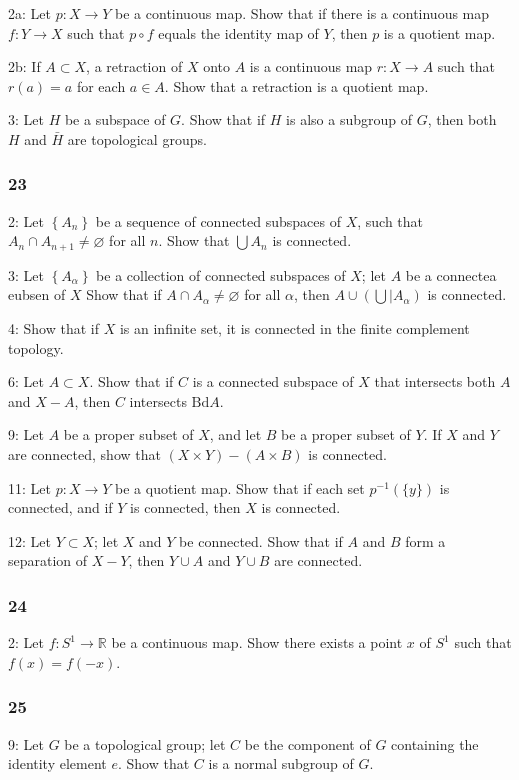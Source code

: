 \documentclass{article}
\begin{document}
2a: Let $p: X \rightarrow Y$ be a continuous map. Show that if there is a continuous map $f: Y \rightarrow X$ such that $p \circ f$ equals the identity map of $Y$, then $p$ is a quotient map.

2b: If $A \subset X$, a retraction of $X$ onto $A$ is a continuous map $r: X \rightarrow A$ such that $r(a)=a$ for each $a \in A$. Show that a retraction is a quotient map.

3: Let $H$ be a subspace of $G$. Show that if $H$ is also a subgroup of $G$, then both $H$ and $\bar{H}$ are topological groups.

\subsubsection*{23}
2: Let $\left\{A_{n}\right\}$ be a sequence of connected subspaces of $X$, such that $A_{n} \cap A_{n+1} \neq \varnothing$ for all $n$. Show that $\bigcup A_{n}$ is connected.

3: Let $\left\{A_{\alpha}\right\}$ be a collection of connected subspaces of $X$; let $A$ be a connectea eubsen of $X$ Show that if $A \cap A_{\alpha} \neq \varnothing$ for all $\alpha$, then $A \cup\left(\bigcup \mid A_{\alpha}\right)$ is connected.

4: Show that if $X$ is an infinite set, it is connected in the finite complement topology.

6: Let $A \subset X$. Show that if $C$ is a connected subspace of $X$ that intersects both $A$ and $X-A$, then $C$ intersects $\mathrm{Bd} A$.

9: Let $A$ be a proper subset of $X$, and let $B$ be a proper subset of $Y$. If $X$ and $Y$ are connected, show that $(X \times Y)-(A \times B)$ is connected.

11: Let $p: X \rightarrow Y$ be a quotient map. Show that if each set $p^{-1}(\{y\})$ is connected, and if $Y$ is connected, then $X$ is connected.

12: Let $Y \subset X$; let $X$ and $Y$ be connected. Show that if $A$ and $B$ form a separation of $X-Y$, then $Y \cup A$ and $Y \cup B$ are connected.

\subsubsection*{24}
2: Let $f: S^{1} \rightarrow \mathbb{R}$ be a continuous map. Show there exists a point $x$ of $S^{1}$ such that $f(x)=f(-x)$.

\subsubsection*{25}
9: Let $G$ be a topological group; let $C$ be the component of $G$ containing the identity element $e$. Show that $C$ is a normal subgroup of $G$.
\end{document}
